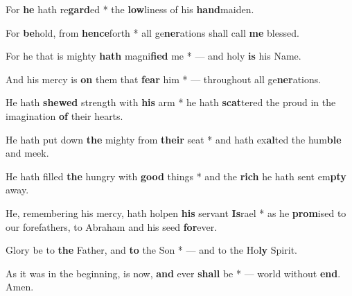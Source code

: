 \begin{multicols}{2}
	For \textbf{he} hath re\textbf{gard}ed * the \textbf{low}liness of his \textbf{hand}maiden.
	
	For \textbf{be}hold, from \textbf{hence}forth * all ge\textbf{ner}ations shall call \textbf{me} blessed.
	
	For he that is mighty \textbf{hath} magni\textbf{fied} me * --- and holy \textbf{is} his Name.
	
	And his mercy is \textbf{on} them that \textbf{fear} him * --- throughout all ge\textbf{ner}ations.
	
	He hath \textbf{shewed} strength with \textbf{his} arm * he hath \textbf{scat}tered the proud in the imagination \textbf{of} their hearts.
	
	He hath put down \textbf{the} mighty from \textbf{their} seat * and hath ex\textbf{al}ted the hum\textbf{ble} and meek.
	
	He hath filled \textbf{the} hungry with \textbf{good} things * and the \textbf{rich} he hath sent em\textbf{pty} away.
	
	He, remembering his mercy, hath holpen \textbf{his} servant \textbf{Is}rael * as he \textbf{prom}ised to our forefathers, to Abraham and his seed \textbf{for}ever.
	
	Glory be to \textbf{the} Father, and \textbf{to} the Son * --- and to the Ho\textbf{ly} Spirit.
	
	As it was in the beginning, is now, \textbf{and} ever \textbf{shall} be * --- world without \textbf{end}. Amen.
\end{multicols}